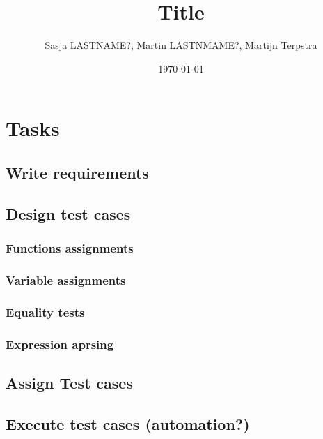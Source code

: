 \documentclass[11pt,a4paper]{article}
\author{Sasja LASTNAME?, Martin LASTNMAME?, Martijn Terpstra}
\date{\today}
\title{Title}
\begin{document}
\maketitle
\tableofcontents




\section{Tasks}
\label{sec:orgheadline9}
\subsection{Write requirements}
\label{sec:orgheadline1}
\subsection{Design test cases}
\label{sec:orgheadline6}
\subsubsection{Functions assignments}
\label{sec:orgheadline2}
\subsubsection{Variable assignments}
\label{sec:orgheadline3}
\subsubsection{Equality tests}
\label{sec:orgheadline4}
\subsubsection{Expression aprsing}
\label{sec:orgheadline5}
\subsection{Assign Test cases}
\label{sec:orgheadline7}
\subsection{Execute test cases (automation?)}
\label{sec:orgheadline8}
\end{document}
